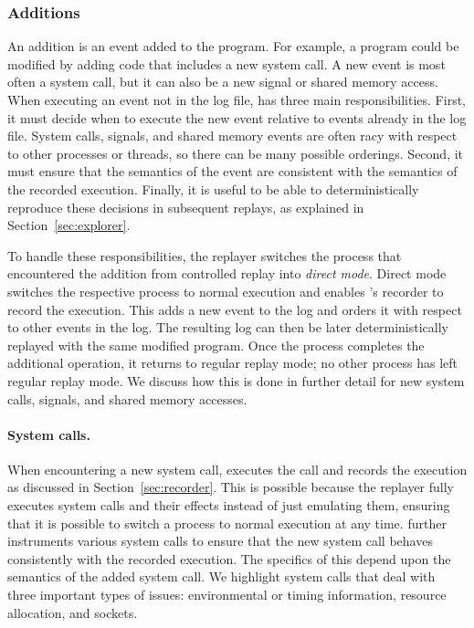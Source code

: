 \subsubsection{Additions}
An addition is an event added to the program.  For example, a program
could be modified by adding code that includes a new system call.  A
new event is most often a system call, but it can also be a new signal
or shared memory access.  When executing an event not in the log file,
{\dora} has three main responsibilities.  First, it must decide when
to execute the new event relative to events already in the log
file. System calls, signals, and shared memory events are often racy
with respect to other processes or threads, so there can be many
possible orderings.  Second, it must ensure that the semantics of the
event are consistent with the semantics of the recorded execution.
Finally, it is useful to be able to deterministically reproduce these
decisions in subsequent replays, as explained in
Section~\ref{sec:explorer}. 

To handle these responsibilities, the replayer switches the process
that encountered the addition from controlled replay into 
\emph{direct mode}.  Direct mode switches the respective process to  
normal execution  and enables {\dora}'s recorder to record the execution.
This adds a new event to the log and orders it
with respect to other events in the log.
The
resulting log can then be later deterministically replayed with the
same modified program.  Once the process completes the additional
operation, it returns to regular replay mode; no other process has
left regular replay mode.  We discuss how this is done in further detail
for new system calls, signals, and shared memory accesses. 

\paragraph{System calls.}
When encountering a new system call, {\dora} executes the
call and records the execution as discussed in Section~\ref{sec:recorder}.
This is possible because the replayer fully executes system calls and
their effects instead of just emulating them, ensuring that it is
possible to switch a process to normal execution at any time.
{\dora} further instruments various system calls to ensure that the
new system call behaves consistently with the recorded execution.
The specifics of this depend upon the semantics of the added system
call. We highlight system calls that deal with three important types of issues:
environmental or timing information, resource allocation, and sockets.

